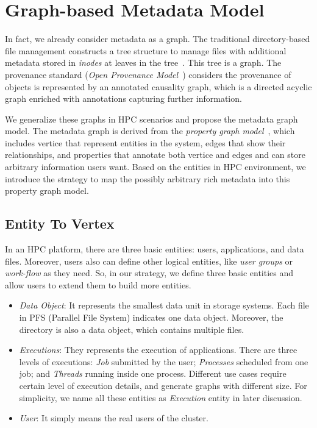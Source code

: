 \section{Graph-based Metadata Model}
In fact, we already consider metadata as a graph. The traditional directory-based file management constructs a tree structure to manage files with additional metadata stored in \textit{inodes} at leaves in the tree~\cite{tanenbaum1992modern}. This tree is a graph. The provenance standard (\textit{Open Provenance Model}~\cite{moreau2011open}) considers the provenance of objects is represented by an annotated causality graph, which is a directed acyclic graph enriched with annotations capturing further information. 

We generalize these graphs in HPC scenarios and propose the metadata graph model. The metadata graph is derived from the \textit{property graph model}~\cite{propertygraph}, which includes vertice that represent entities in the system, edges that show their relationships, and properties that annotate both vertice and edges and can store arbitrary information users want. Based on the entities in HPC environment, we introduce the strategy to map the possibly arbitrary rich metadata into this property graph model.

\subsection{Entity To Vertex}

In an HPC platform, there are three basic entities: users, applications, and data files. Moreover, users also can define other logical entities, like \textit{user groups} or \textit{work-flow} as they need. So, in our strategy, we define three basic entities and allow users to extend them to build more entities.

\begin{itemize}
\item \textit{Data Object}: It represents the smallest data unit in storage systems. Each file in PFS (Parallel File System) indicates one data object. Moreover, the directory is also a data object, which contains multiple files. %

\item \textit{Executions}: They represents the execution of applications. There are three levels of executions: \textit{Job} submitted by
the user; \textit{Processes} scheduled from one job; and \textit{Threads} running inside one process. Different use cases require certain level of execution details, and generate graphs with different size. For simplicity, we name all these entities as \textit{Execution} entity in later discussion.

\item \textit{User}: It simply means the real users of the cluster.
\end{itemize}

